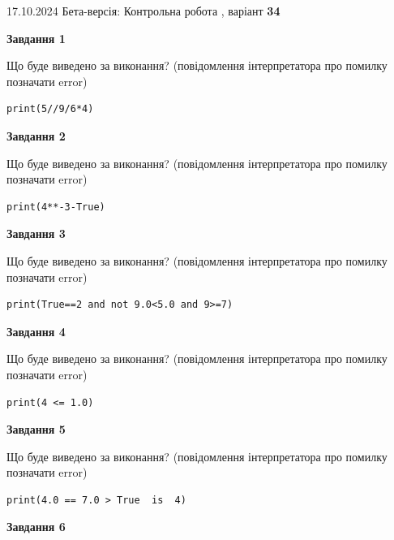 \documentclass[12pt, ukrainian]{article}
\begin{document}
{\Large{17.10.2024 Бета-версія: Контрольна робота , варіант  \No \textbf { 34 }\par}}
{
\begin {large}
{\begin {center}\textbf{Завдання 1}\end {center}}

Що буде виведено за виконання? (повідомлення інтерпретатора про помилку позначати error)\par
\begin{verbatim}
print(5//9/6*4)
\end{verbatim}

{\begin {center}\textbf{Завдання 2}\end {center}}

Що буде виведено за виконання? (повідомлення інтерпретатора про помилку позначати error)\par
\begin{verbatim}
print(4**-3-True)
\end{verbatim}

{\begin {center}\textbf{Завдання 3}\end {center}}

Що буде виведено за виконання? (повідомлення інтерпретатора про помилку позначати error)\par
\begin{verbatim}
print(True==2 and not 9.0<5.0 and 9>=7)
\end{verbatim}

{\begin {center}\textbf{Завдання 4}\end {center}}

Що буде виведено за виконання? (повідомлення інтерпретатора про помилку позначати error)\par
\begin{verbatim}
print(4 <= 1.0)
\end{verbatim}

{\begin {center}\textbf{Завдання 5}\end {center}}

Що буде виведено за виконання? (повідомлення інтерпретатора про помилку позначати error)\par
\begin{verbatim}
print(4.0 == 7.0 > True  is  4)
\end{verbatim}

{\begin {center}\textbf{Завдання 6}\end {center}}


\end{large}}
\end{document}
